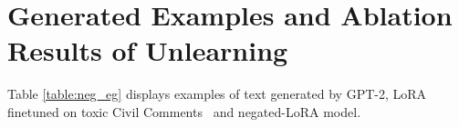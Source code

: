 







\section{Generated Examples and Ablation Results of Unlearning}
\label{sec:apx_example_toxic}

Table \ref{table:neg_eg} displays examples of text generated by GPT-2, LoRA finetuned on toxic Civil Comments~\citep{borkan2019nuanced} and negated-LoRA model. 

